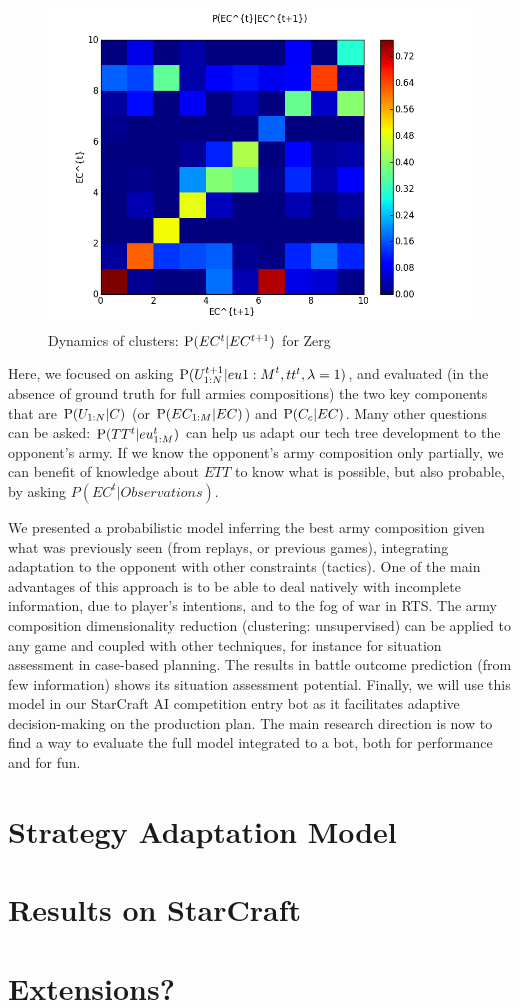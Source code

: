 \begin{figure}[htp]
\centerline{\includegraphics[width=0.55\columnwidth]{images/Z_EC_knowing_ECnext.png}}
\caption{Dynamics of clusters: $\mathrm{P}(EC^t|EC^{t+1})$ for Zerg}
\label{ecknowingecnext}
\vspace{-0.2cm}
\end{figure}

Here, we focused on asking $\mathrm{P}(U_{1:N}^{t+1}|eu{1:M}^t, tt^t, \lambda=1)$, and evaluated (in the absence of ground truth for full armies compositions) the two key components that are $\mathrm{P}(U_{1:N}|C)$ (or $\mathrm{P}(EC_{1:M}|EC)$) and $\mathrm{P}(C_c|EC)$. Many other questions can be asked: $\mathrm{P}(TT^t|eu_{1:M}^t)$ can help us adapt our tech tree development to the opponent's army. If we know the opponent's army composition only partially, we can benefit of knowledge about $ETT$ to know what is possible, but also probable, by asking $P(EC^t|Observations)$.


We presented a probabilistic model inferring the best army composition given what was previously seen (from replays, or previous games), integrating adaptation to the opponent with other constraints (tactics). One of the main advantages of this approach is to be able to deal natively with incomplete information, due to player's intentions, and to the fog of war in RTS. The army composition dimensionality reduction (clustering: unsupervised) can be applied to any game and coupled with other techniques, for instance for situation assessment in case-based planning. The results in battle outcome prediction (from few information) shows its situation assessment potential. Finally, we will use this model in our StarCraft AI competition entry bot as it facilitates adaptive decision-making on the production plan. The main research direction is now to find a way to evaluate the full model integrated to a bot, both for performance and for fun.


\section{Strategy Adaptation Model}
\section{Results on StarCraft}
\section{Extensions?}


